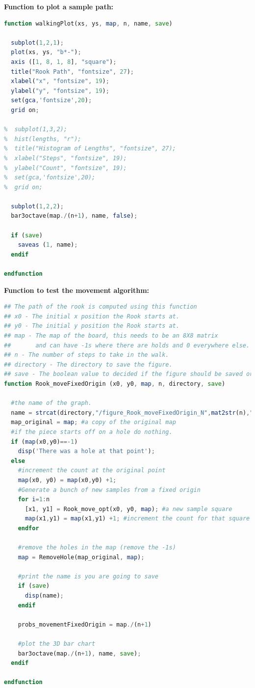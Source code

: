 \documentclass{amsart}
\numberwithin{equation}{section}
\begin{document}
\textbf{Function to plot a sample path:}
\begin{lstlisting}[language=octave]
function walkingPlot(xs, ys, map, n, name, save)
  
  subplot(1,2,1);
  plot(xs, ys, "b*-");
  axis ([1, 8, 1, 8], "square");
  title("Rook Path", "fontsize", 27);
  xlabel("x", "fontsize", 19);
  ylabel("y", "fontsize", 19);
  set(gca,'fontsize',20);
  grid on;
  
%  subplot(1,3,2);
%  hist(lengths, "r");
%  title("Histogram of Lengths", "fontsize", 27);
%  xlabel("Steps", "fontsize", 19);
%  ylabel("Count", "fontsize", 19);
%  set(gca,'fontsize',20);
%  grid on;
  
  subplot(1,2,2);
  bar3octave(map./(n+1), name, false);
  
  if (save)
    saveas (1, name);
  endif

endfunction
\end{lstlisting}

\textbf{Function to test the movement algorithm:}
\begin{lstlisting}[language=octave]
## The path of the rook is computed using this function
## x0 - The initial x position the Rook starts at.
## y0 - The initial y position the Rook starts at.
## map - The map of the board, this needs to be an 8X8 matrix
##       and can have -1s where there are holds and 0 everywhere else.
## n - The number of steps to take in the walk.
## directory - The directory to save the figure.
## save - The boolean value to decided if the figure should be saved or not.
function Rook_moveFixedOrigin (x0, y0, map, n, directory, save)
  
  #the name of the graph.
  name = strcat(directory,"/figure_Rook_moveFixedOrigin_N",mat2str(n),"_x", mat2str(x0),"_y", mat2str(y0),".png");
  map_original = map; #a copy of the original map
  #if the piece starts off on a hole do nothing.
  if (map(x0,y0)==-1)
    disp('There was a hole at that point');
  else
    #increment the count at the original point
    map(x0, y0) = map(x0,y0) +1;
    #Generate a bunch of new samples from a fixed origin
    for i=1:n
      [x1, y1] = Rook_move_opt(x0, y0, map); #a new sample square
      map(x1,y1) = map(x1,y1) +1; #increment the count for that square
    endfor
    
    #remove the holes in the map (remove the -1s)
    map = RemoveHole(map_original, map);
    
    #print the name is you are going to save
    if (save)
      disp(name);
    endif
    
    probs_movementFixedOrigin = map./(n+1)
    
    #plot the 3D bar chart
    bar3octave(map./(n+1), name, save);
  endif
  
endfunction

\end{lstlisting}
\end{document}
